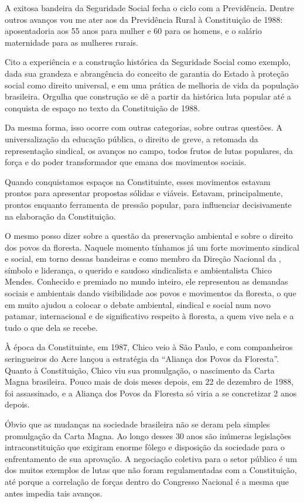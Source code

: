 A exitosa bandeira da Seguridade Social fecha o ciclo com a Previdência.
Dentre outros avanços vou me ater aos da Previdência Rural à
Constituição de 1988: aposentadoria aos 55 anos para mulher e 60 para os
homens, e o salário maternidade para as mulheres rurais.

Cito a experiência e a construção histórica da Seguridade Social como
exemplo, dada sua grandeza e abrangência do conceito de garantia do
Estado à proteção social como direito universal, e em uma prática de
melhoria de vida da população brasileira. Orgulha que construção se
dê a partir da histórica luta popular até a conquista de espaço no
texto da Constituição de 1988.

Da mesma forma, isso ocorre com outras categorias, sobre outras questões. A
universalização da educação pública, o direito de greve, a retomada da
representação sindical, os avanços no campo, todos frutos de lutas populares,
da força e do poder transformador que emana dos movimentos sociais.

Quando conquistamos espaços na Constituinte, esses movimentos estavam
prontos para apresentar propostas sólidas e viáveis. Estavam,
principalmente, prontos enquanto ferramenta de pressão popular, para
influenciar decisivamente na elaboração da Constituição.

O mesmo posso dizer sobre a questão da preservação ambiental e sobre o
direito dos povos da floresta. Naquele momento tínhamos já um forte
movimento sindical e social, em torno dessas bandeiras e como membro da
Direção Nacional da , símbolo e liderança, o querido e saudoso
sindicalista e ambientalista Chico Mendes. Conhecido e premiado no mundo
inteiro, ele representou as demandas sociais e ambientais dando
visibilidade aos povos e movimentos da floresta, o que em muito ajudou a
colocar o debate ambiental, sindical e social num novo patamar,
internacional e de significativo respeito à floresta, a quem vive nela e
a tudo o que dela se recebe.

À época da Constituinte, em 1987, Chico veio à São Paulo, e com
companheiros seringueiros do Acre lançou a estratégia da ``Aliança dos
Povos da Floresta''. Quanto à Constituição, Chico viu sua promulgação, o
nascimento da Carta Magna brasileira. Pouco mais de dois meses depois,
em 22 de dezembro de 1988, foi assassinado, e a Aliança dos Povos da
Floresta só viria a se concretizar 2 anos depois.

Óbvio que as mudanças na sociedade brasileira não se deram pela simples
promulgação da Carta Magna. Ao longo desses 30 anos são inúmeras
legislações intraconstituição que exigiram enorme fôlego e disposição
da sociedade para o enfrentamento de sua aprovação. A negociação
coletiva para o setor público é um dos muitos exemplos de lutas que não
foram regulamentadas com a Constituição, até porque a correlação de
forças dentro do Congresso Nacional é a mesma que antes impedia tais
avanços.


